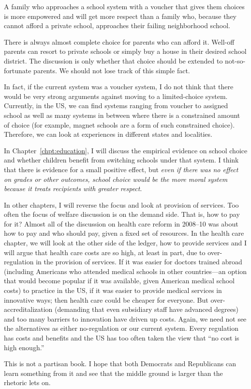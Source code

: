 A family who approaches a school system with a voucher that gives them choices
is more empowered and will get more respect than a family who, because they
cannot afford a private school, approaches their failing neighborhood school.

There is always almost complete choice for parents who can afford it. Well-off
parents can resort to private schools or simply buy a house in their desired
school district. The discussion is only whether that choice should be extended
to not-so-fortunate parents. We should not lose track of this simple fact.

In fact, if the current system was a voucher system, I do not think that there
would be very strong arguments against moving to a limited-choice system.
Currently, in the US, we can find systems ranging from voucher to assigned
school as well as many systems in between where there is a constrained amount of
choice (for example, magnet schools are a form of such constrained choice).
Therefore, we can look at experiences in different states and localities.

In Chapter~\ref{chpt:education}, I will discuss the empirical evidence on
school choice and whether children benefit from switching schools under that
system. I think that there is evidence for a small positive effect, but
\emph{even if there was no effect on grades or other outcomes, school choice
would be the more moral system because it treats recipients with greater
respect}.

In other chapters, I will reverse the focus and look at provision of services.
Too often the focus of welfare discussion is on the demand side. That is, how
to pay for it? Almost all of the discussion on health care reform in 2008--10
was about how to pay and who should pay, given a fixed set of resources. In the
health care chapter, we will look at the other side of the ledger, how to
provide services and I will argue that health care costs are so high, at least
in part, due to over-regulation in the provision of services. If it was easier
for doctors trained abroad (including Americans who attended medical schools in
other countries---an option that would become popular if it was available,
given American medical school costs) to practice in the US, if it was easier to
provide medical services in innovative ways; then health care could be cheaper
for everyone. But over-accreditalization (demanding that even subsidiary staff
have advanced degrees) and too many barriers to innovation have driven up
costs. Again, we need not see the alternatives as either no-regulation or our
current system. Every regulation has costs and benefits and the US has too
often taken the view that ``no cost is high enough.''

This is not a partisan book. I hope that both Democrats and Republicans can
learn something from it and see that the middle ground is larger than the
rhetoric lets on.


